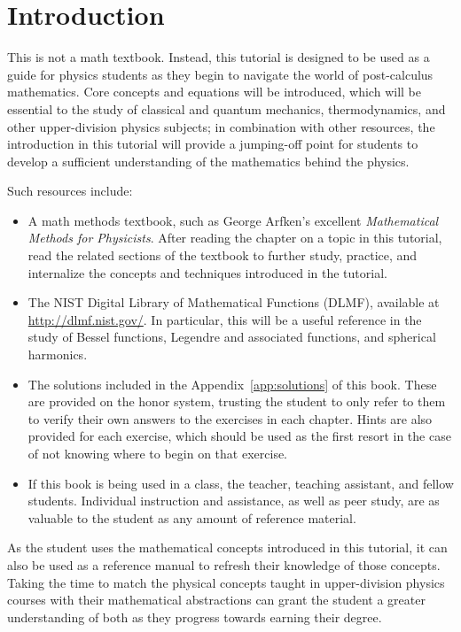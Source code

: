 \chapter{Introduction}

This is not a math textbook. Instead, this tutorial is designed to be used as a
guide for physics students as they begin to navigate the world of post-calculus
mathematics. Core concepts and equations will be introduced, which will be
essential to the study of classical and quantum mechanics, thermodynamics, and
other upper-division physics subjects; in combination with other resources, the
introduction in this tutorial will provide a jumping-off point for students to
develop a sufficient understanding of the mathematics behind the physics.

Such resources include:

\begin{itemize}

\item A math methods textbook, such as George Arfken's excellent
\textit{Mathematical Methods for Physicists}. After reading the chapter on a
topic in this tutorial, read the related sections of the textbook to further
study, practice, and internalize the concepts and techniques introduced in the
tutorial.

\item The NIST Digital Library of Mathematical Functions (DLMF), available at
\url{http://dlmf.nist.gov/}. In particular, this will be a useful reference in
the study of Bessel functions, Legendre and associated functions, and spherical
harmonics.

\item The solutions included in the Appendix~\ref{app:solutions} of this book.
These are provided on the honor system, trusting the student to only refer to
them to verify their own answers to the exercises in each chapter. Hints are
also provided for each exercise, which should be used as the first resort in the
case of not knowing where to begin on that exercise.

\item If this book is being used in a class, the teacher, teaching assistant,
and fellow students. Individual instruction and assistance, as well as peer
study, are as valuable to the student as any amount of reference material.

\end{itemize}

As the student uses the mathematical concepts introduced in this tutorial, it
can also be used as a reference manual to refresh their knowledge of those
concepts. Taking the time to match the physical concepts taught in
upper-division physics courses with their mathematical abstractions can grant
the student a greater understanding of both as they progress towards earning
their degree.
